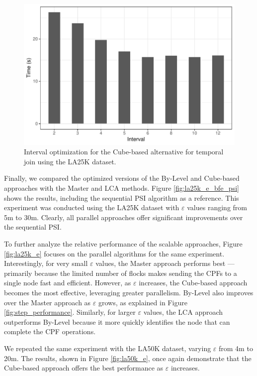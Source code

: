 \begin{figure}
    \centering
    \includegraphics[width=0.8\linewidth]{figures/plots/07_interval_performance/interval-performance.pdf}
    \caption{Interval optimization for the Cube-based alternative for temporal join using the LA25K dataset.}\label{fig:interval_performance}
\end{figure}

Finally, we compared the optimized versions of the By-Level and Cube-based approaches with the Master and LCA methods. Figure \ref{fig:la25k_e_bfe_psi} shows the results, including the sequential PSI algorithm as a reference. This experiment was conducted using the LA25K dataset with $\varepsilon$ values ranging from 5m to 30m. Clearly, all parallel approaches offer significant improvements over the sequential PSI.

To further analyze the relative performance of the scalable approaches, Figure \ref{fig:la25k_e} focuses on the parallel algorithms for the same experiment. Interestingly, for very small $\varepsilon$ values, the Master approach performs best —primarily because the limited number of flocks makes sending the CPFs to a single node fast and efficient. However, as $\varepsilon$ increases, the Cube-based approach becomes the most effective, leveraging greater parallelism. By-Level also improves over the Master approach as $\varepsilon$ grows, as explained in Figure \ref{fig:step_performance}. Similarly, for larger $\varepsilon$ values, the LCA approach outperforms By-Level because it more quickly identifies the node that can complete the CPF operations.

We repeated the same experiment with the LA50K dataset, varying $\varepsilon$ from 4m to 20m. The results, shown in Figure \ref{fig:la50k_e}, once again demonstrate that the Cube-based approach offers the best performance as $\varepsilon$ increases.

